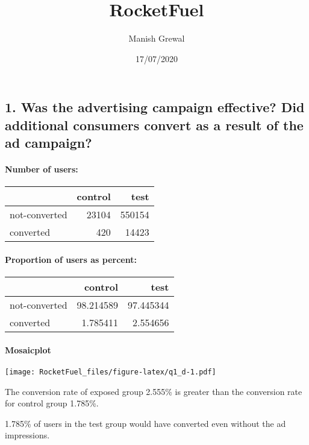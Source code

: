 \documentclass[
]{article}
\title{RocketFuel}
\author{Manish Grewal}
\date{17/07/2020}
\begin{document}
\maketitle

\hypertarget{was-the-advertising-campaign-effective-did-additional-consumers-convert-as-a-result-of-the-ad-campaign}{%
\subsection{1. Was the advertising campaign effective? Did additional
consumers convert as a result of the ad
campaign?}\label{was-the-advertising-campaign-effective-did-additional-consumers-convert-as-a-result-of-the-ad-campaign}}

\hypertarget{number-of-users}{%
\paragraph{Number of users:}\label{number-of-users}}

\begin{longtable}[]{@{}lrr@{}}
\toprule
& control & test\tabularnewline
\midrule
\endhead
not-converted & 23104 & 550154\tabularnewline
converted & 420 & 14423\tabularnewline
\bottomrule
\end{longtable}

\hypertarget{proportion-of-users-as-percent}{%
\paragraph{Proportion of users as
percent:}\label{proportion-of-users-as-percent}}

\begin{longtable}[]{@{}lrr@{}}
\toprule
& control & test\tabularnewline
\midrule
\endhead
not-converted & 98.214589 & 97.445344\tabularnewline
converted & 1.785411 & 2.554656\tabularnewline
\bottomrule
\end{longtable}

\hypertarget{mosaicplot}{%
\paragraph{Mosaicplot}\label{mosaicplot}}

\texttt{[image: RocketFuel\_files/figure-latex/q1\_d-1.pdf]}

The conversion rate of exposed group 2.555\% is greater than the
conversion rate for control group 1.785\%.

1.785\% of users in the test group would have converted even without the
ad impressions.
\end{document}
